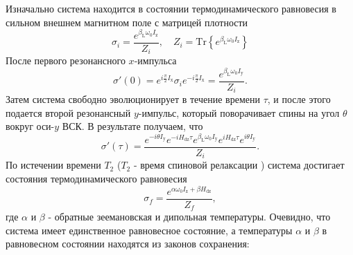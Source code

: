 \documentclass[utf8]{jetp}
\begin{document}
{Изначально система находится в состоянии термодинамического равновесия в сильном внешнем магнитном поле с матрицей плотности
%
\begin{equation}
  \label{eq:a1}
  \sigma_{i} = \dfrac{e^{\beta_\mathrm{L} \omega_{0} I_\mathrm{z}}}{Z_{i}} ,
  \quad
  Z_{i} = \mathrm{Tr}\left\{e^{\beta_\mathrm{L} \omega_{0} I_\mathrm{z}} \right\}
\end{equation}
%
После первого резонансного $x$-импульса
%
\begin{equation}
  \label{eq:a2}
  \sigma'(0) = e^{ i \frac \pi 2 I_\mathrm{x}}
  \sigma_{i}
  e^{-i \frac \pi 2 I_\mathrm{x}}
  = \dfrac{e^{\beta_\mathrm{L} \omega_{0} I_\mathrm{y}}}{Z_{i}} .
\end{equation}
%
Затем система свободно эволюционирует в течение времени $\tau$,
и после этого подается второй резонансный $y$-импульс, который поворачивает спины на угол $\theta$ вокруг оси-$y$ ВСК.
В результате получаем, что
\begin{equation}
  \label{eq:a3}
  \sigma'(\tau)
  = \dfrac{
   e^{-i \theta I_\mathrm{y}} e^{-i H_\mathrm{dz} \tau}
   e^{\beta_\mathrm{L} \omega_{0} I_\mathrm{y}}
   e^{i H_\mathrm{dz} \tau} e^{i \theta I_\mathrm{y}}
  }{Z_{i}}.
\end{equation}
%
По истечении времени $T_2$ ($T_2$ - время спиновой релаксации \cite{Goldman_1970}) система достигает состояния термодинамического равновесия
\begin{equation}
  \label{eq:a4}
  \sigma_{f}
  = \dfrac{ e^{\alpha \omega_{0} I_\mathrm{z} + \beta H_\mathrm{dz}} }{Z_f},
\end{equation}
%
где $\alpha$ и $\beta$ - обратные зеемановская и дипольная температуры.
Очевидно, что система имеет единственное  равновесное состояние, а
 температуры $\alpha$ и $\beta$ в равновесном состоянии находятся из
законов сохранения:

}
\end{document}
